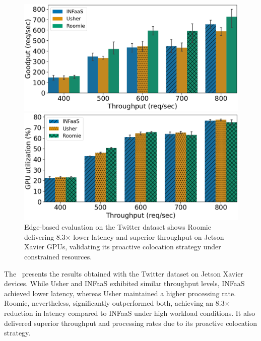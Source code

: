 \begin{figure}
\begin{minipage}[t]{.24\linewidth}
		\centering
		\includegraphics[width=\linewidth]{chapters/roomie/images/JetsonNano/twitter-all-models/goodput.pdf}
	\end{minipage}
	\hfill
	\begin{minipage}[t]{.24\linewidth}
		\centering
		\includegraphics[width=\linewidth]{chapters/roomie/images/JetsonNano/twitter-all-models/gpu_utilization.png}
	\end{minipage}
	\caption{Edge-based evaluation on the Twitter dataset shows Roomie delivering 8.3× lower latency and superior throughput on Jetson Xavier GPUs, validating its proactive colocation strategy under constrained resources.}
	\label{fig:JetsonNano/twitter-all-models}
	\vspace{-3mm}
\end{figure}

The~ presents the results obtained with the Twitter dataset on Jetson Xavier devices. While Usher and INFaaS exhibited similar throughput levels, INFaaS achieved lower latency, whereas Usher maintained a higher processing rate. Roomie, nevertheless, significantly outperformed both, achieving an 8.3× reduction in latency compared to INFaaS under high workload conditions. It also delivered superior throughput and processing rates due to its proactive colocation strategy.

